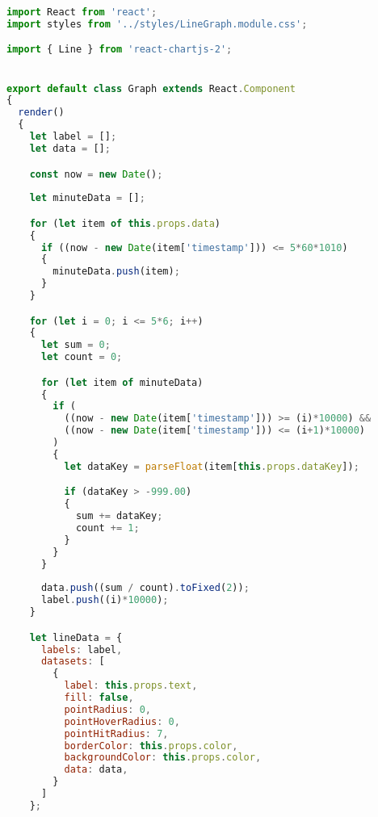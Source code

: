 \documentclass[a4paper,12pt,twoside,openright,titlepage]{book}
\begin{document}
\bigskip

\begin{lstlisting}[title={raspberrypi/ui/components/LineGraph.js}, language=JavaScript]
import React from 'react';
import styles from '../styles/LineGraph.module.css';

import { Line } from 'react-chartjs-2';


export default class Graph extends React.Component
{
  render()
  {
    let label = [];
    let data = [];

    const now = new Date();
    
    let minuteData = [];

    for (let item of this.props.data)
    {
      if ((now - new Date(item['timestamp'])) <= 5*60*1010)
      {
        minuteData.push(item);
      }
    }

    for (let i = 0; i <= 5*6; i++)
    {
      let sum = 0;
      let count = 0;

      for (let item of minuteData)
      {
        if (
          ((now - new Date(item['timestamp'])) >= (i)*10000) &&
          ((now - new Date(item['timestamp'])) <= (i+1)*10000)
        )
        {
          let dataKey = parseFloat(item[this.props.dataKey]);

          if (dataKey > -999.00)
          {
            sum += dataKey;
            count += 1;
          }
        }
      }
      
      data.push((sum / count).toFixed(2));
      label.push((i)*10000);
    }

    let lineData = {
      labels: label,
      datasets: [
        {
          label: this.props.text,
          fill: false,
          pointRadius: 0,
          pointHoverRadius: 0,
          pointHitRadius: 7,
          borderColor: this.props.color,
          backgroundColor: this.props.color,
          data: data,
        }
      ]
    };


\end{lstlisting}
\end{document}
